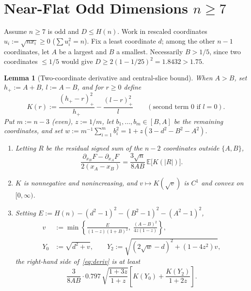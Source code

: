 \documentclass[11pt]{article}
\theoremstyle{plain}
\newtheorem{lemma}[theorem]{Lemma}
\theoremstyle{definition}
\theoremstyle{remark}
\begin{document}
\section{Near-Flat Odd Dimensions \texorpdfstring{$n \ge 7$}{n >= 7}}

Assume $n \ge 7$ is odd and $D \le H(n)$.
Work in rescaled coordinates $u_i := \sqrt{n x_i} \ge 0$ ($\sum u_i^2 = n$).
Fix a least coordinate $d$; among the other $n - 1$ coordinates, let $A$ be a largest and $B$ a smallest.
Necessarily $B > 1/5$, since two coordinates $\le 1/5$ would give $D \ge 2(1 - 1/25)^2 = 1.8432 > 1.75$.

\begin{lemma}[Two-coordinate derivative and central-slice bound]\label{lem:slices}
When $A > B$, set $h_+ := A + B$, $l := A - B$, and for $r \ge 0$ define
\[
K(r) := \frac{(h_+ - r)_+^2}{h_+} - \frac{(l - r)_+^2}{l} \qquad (\text{second term } 0 \text{ if } l = 0).
\]
Put $m := n - 3$ (even), $z := 1/m$, let $b_1, \dots, b_m \in [B, A]$ be the remaining coordinates, and set $w := m^{-1}\sum_{i=1}^m b_i^2 = 1 + z(3 - d^2 - B^2 - A^2)$.
\begin{enumerate}[label=\textup{(\arabic*)}]
\item Letting $R$ be the residual signed sum of the $n - 2$ coordinates outside $\{A, B\}$,
\begin{equation}\label{eq:deriv}
\frac{\partial_{x_B} F - \partial_{x_A} F}{2(x_A - x_B)} = \frac{3\sqrt{n}}{8AB}\,\mathbb{E}\bigl[K(|R|)\bigr].
\end{equation}
\item $K$ is nonnegative and nonincreasing, and $v \mapsto K(\sqrt{v})$ is $C^1$ and convex on $[0, \infty)$.
\item Setting $E := H(n) - (d^2 - 1)^2 - (B^2 - 1)^2 - (A^2 - 1)^2$,
\begin{equation}\label{eq:y0y2}
\begin{aligned}
v &:= \min\!\left\{\frac{E}{(1 - z)(1 + B)^2},\; \frac{(A - B)^2}{4z(1 - z)}\right\}, \\
Y_0 &:= \sqrt{d^2 + v}, \qquad
Y_2 := \sqrt{(2\sqrt{w} - d)^2 + (1 - 4z^2)v},
\end{aligned}
\end{equation}
the right-hand side of~\eqref{eq:deriv} is at least
\begin{equation}\label{eq:fourvar}
\frac{3}{8AB}\cdot 0.797\,\sqrt{\frac{1 + 3z}{1 + z}}\left[K(Y_0) + \frac{K(Y_2)}{1 + 2z}\right].
\end{equation}
\end{enumerate}
\end{lemma}
\end{document}
